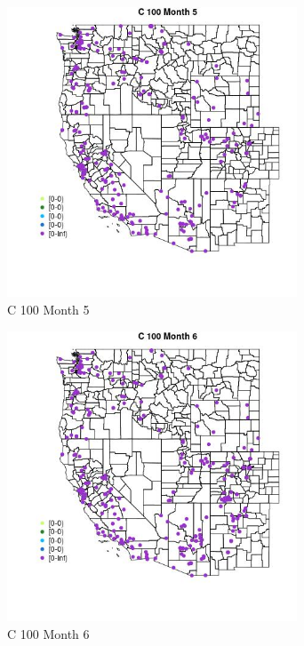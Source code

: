 \begin{figure} 
\centering  
\includegraphics[width=0.77\textwidth]{Code_Outputs/Report_ML_input_PM25_Step4_part_e_de_duplicated_aveswNAs_MapObsMo5C_100.jpg} 
\caption{\label{fig:Report_ML_input_PM25_Step4_part_e_de_duplicated_aveswNAsMapObsMo5C_100}C 100 Month 5} 
\end{figure} 
 

\clearpage 

\begin{figure} 
\centering  
\includegraphics[width=0.77\textwidth]{Code_Outputs/Report_ML_input_PM25_Step4_part_e_de_duplicated_aveswNAs_MapObsMo6C_100.jpg} 
\caption{\label{fig:Report_ML_input_PM25_Step4_part_e_de_duplicated_aveswNAsMapObsMo6C_100}C 100 Month 6} 
\end{figure} 
 

